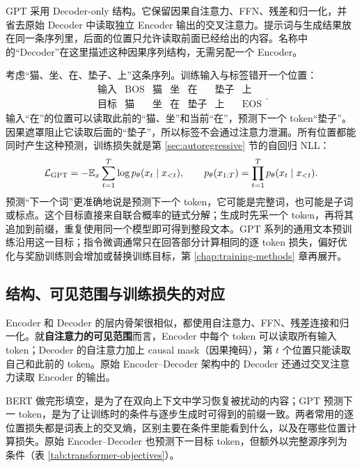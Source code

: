 GPT 采用 Decoder-only 结构。它保留因果自注意力、FFN、残差和归一化，并省去原始 Decoder 中读取独立 Encoder 输出的交叉注意力。提示词与生成结果放在同一条序列里，后面的位置只允许读取前面已经给出的内容。名称中的“Decoder”在这里描述这种因果序列结构，无需另配一个 Encoder。

考虑“猫、坐、在、垫子、上”这条序列。训练输入与标签错开一个位置：
\begin{equation}
 \begin{array}{c|cccccc}
 \text{输入}&\mathrm{BOS}&\text{猫}&\text{坐}&\text{在}&\text{垫子}&\text{上}\\
 \text{目标}&\text{猫}&\text{坐}&\text{在}&\text{垫子}&\text{上}&\mathrm{EOS}
 \end{array}.
\end{equation}
输入“在”的位置可以读取此前的“猫、坐”和当前“在”，预测下一个 token“垫子”。因果遮罩阻止它读取后面的“垫子”，所以标签不会通过注意力泄漏。所有位置都能同时产生这种预测，训练损失就是第 \ref{sec:autoregressive} 节的自回归 NLL：
\begin{equation}
 \mathcal L_{\mathrm{GPT}}=-\mathbb{E}_x\sum_{t=1}^{T}\log p_\theta(x_t\mid x_{<t}),\qquad
 p_\theta(x_{1:T})=\prod_{t=1}^{T}p_\theta(x_t\mid x_{<t}).
 \label{eq:gpt-next-token}
\end{equation}
预测“下一个词”更准确地说是预测下一个 token，它可能是完整词，也可能是子词或标点。这个目标直接来自联合概率的链式分解；生成时先采一个 token，再将其追加到前缀，重复使用同一个模型即可得到整段文本。GPT 系列的通用文本预训练沿用这一目标；指令微调通常只在回答部分计算相同的逐 token 损失，偏好优化与奖励训练则会增加或替换训练目标，第 \ref{chap:training-methods} 章再展开。

\subsection{结构、可见范围与训练损失的对应}

Encoder 和 Decoder 的层内骨架很相似，都使用自注意力、FFN、残差连接和归一化。就\textbf{自注意力的可见范围}而言，Encoder 中每个 token 可以读取所有输入 token；Decoder 的自注意力加上 causal mask（因果掩码），第 \(t\) 个位置只能读取自己和此前的 token。原始 Encoder--Decoder 架构中的 Decoder 还通过交叉注意力读取 Encoder 的输出。

BERT 做完形填空，是为了在双向上下文中学习恢复被扰动的内容；GPT 预测下一 token，是为了让训练时的条件与逐步生成时可得到的前缀一致。两者常用的逐位置损失都是词表上的交叉熵，区别主要在条件里能看到什么，以及在哪些位置计算损失。原始 Encoder--Decoder 也预测下一目标 token，但额外以完整源序列为条件（表 \ref{tab:transformer-objectives}）。


